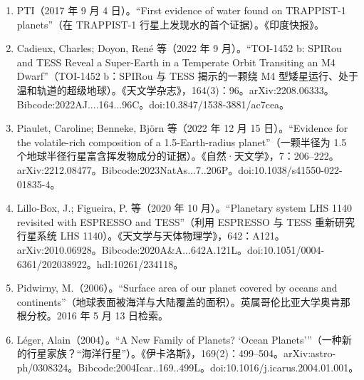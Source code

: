 \begin{enumerate}
\item PTI（2017 年 9 月 4 日）。“First evidence of water found on TRAPPIST-1 planets”（在 TRAPPIST-1 行星上发现水的首个证据）。《印度快报》。
\item Cadieux, Charles; Doyon, René 等（2022 年 9 月）。“TOI-1452 b: SPIRou and TESS Reveal a Super-Earth in a Temperate Orbit Transiting an M4 Dwarf”（TOI-1452 b：SPIRou 与 TESS 揭示的一颗绕 M4 型矮星运行、处于温和轨道的超级地球）。《天文学杂志》，164(3)：96。arXiv:2208.06333。Bibcode:2022AJ....164...96C。doi:10.3847/1538-3881/ac7cea。
\item Piaulet, Caroline; Benneke, Björn 等（2022 年 12 月 15 日）。“Evidence for the volatile-rich composition of a 1.5-Earth-radius planet”（一颗半径为 1.5 个地球半径行星富含挥发物成分的证据）。《自然·天文学》，7：206–222。arXiv:2212.08477。Bibcode:2023NatAs...7..206P。doi:10.1038/s41550-022-01835-4。
\item Lillo-Box, J.; Figueira, P. 等（2020 年 10 月）。“Planetary system LHS 1140 revisited with ESPRESSO and TESS”（利用 ESPRESSO 与 TESS 重新研究行星系统 LHS 1140）。《天文学与天体物理学》，642：A121。arXiv:2010.06928。Bibcode:2020A&A...642A.121L。doi:10.1051/0004-6361/202038922。hdl:10261/234118。
\item Pidwirny, M.（2006）。“Surface area of our planet covered by oceans and continents”（地球表面被海洋与大陆覆盖的面积）。英属哥伦比亚大学奥肯那根分校。2016 年 5 月 13 日检索。
\item Léger, Alain（2004）。“A New Family of Planets? ‘Ocean Planets’”（一种新的行星家族？“海洋行星”）。《伊卡洛斯》，169(2)：499–504。arXiv:astro-ph/0308324。Bibcode:2004Icar..169..499L。doi:10.1016/j.icarus.2004.01.001。
\end{enumerate}